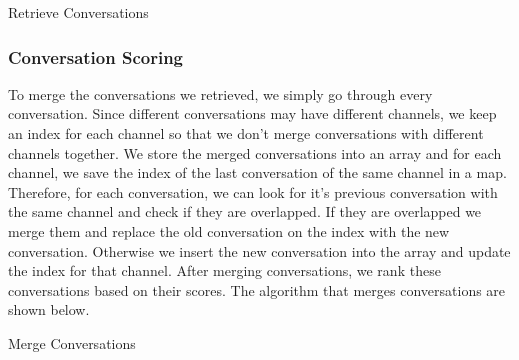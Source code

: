 \begin{algorithm}
	\SetAlgoLined
	\caption{Retrieve Conversations}
\end{algorithm}
		
\subsubsection{Conversation Scoring}

To merge the conversations we retrieved, we simply go through every conversation. Since different conversations may have different channels, we keep an index for each channel so that we don't merge conversations with different channels together. We store the merged conversations into an array and for each channel, we save the index of the last conversation of the same channel in a map. Therefore, for each conversation, we can look for it's previous conversation with the same channel and check if they are overlapped. If they are overlapped we merge them and replace the old conversation on the index with the new conversation. Otherwise we insert the new conversation into the array and update the index for that channel. After merging conversations, we rank these conversations based on their scores. The algorithm that merges conversations are shown below.

\begin{algorithm}
	\SetAlgoLined
	\caption{Merge Conversations}
\end{algorithm}


